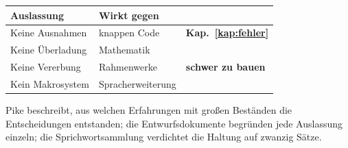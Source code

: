 \begin{aufgabe}
\begin{warnung}
\begin{center}
\renewcommand{\arraystretch}{1.5}
\begin{tabular}{@{}P{3.4cm}P{2.6cm}P{2.2cm}@{}}
\toprule
\textbf{Auslassung} & \textbf{Wirkt gegen} & \\
\midrule
Keine Ausnahmen & \textcolor{akzent}{knappen Code} & \textbf{Kap.~\ref{kap:fehler}}\\
Keine Überladung & \textcolor{akzent}{Mathematik} & \\
Keine Vererbung & \textcolor{akzent}{Rahmenwerke} & \textbf{schwer zu bauen}\\
Kein Makrosystem & \textcolor{akzent}{Sprach\-erweiterung} & \\
\bottomrule
\end{tabular}
\end{center}

\begin{center}
\begin{minipage}{0.88\textwidth}
\end{minipage}
\end{center}

\begin{center}
\end{center}
\end{warnung}
\end{aufgabe}
\vspace{-4pt}
\noindent Pike beschreibt, aus welchen Erfahrungen mit großen Beständen die Entscheidungen entstanden; die Ent\-wurfs\-do\-ku\-men\-te be\-grün\-den jede Aus\-las\-sung einzeln; die Sprich\-wort\-samm\-lung verdichtet die Haltung auf zwanzig Sätze.
